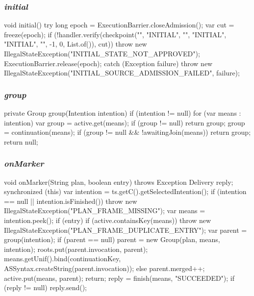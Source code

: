\documentclass[12pt,a4paper,oneside]{extreport}
\begin{document}
\subsubsection*{\textit{initial}}
\begin{thesiscode}[firstnumber=29]
void initial() {
    try {
        long epoch = ExecutionBarrier.closeAdmission();
        var cut = freeze(epoch);
        if (!handler.verify(checkpoint("", "INITIAL", "", "INITIAL", "INITIAL", "", -1, 0, List.of()), cut))
            throw new IllegalStateException("INITIAL_STATE_NOT_APPROVED");
        ExecutionBarrier.release(epoch);
    } catch (Exception failure) { throw new IllegalStateException("INITIAL_SOURCE_ADMISSION_FAILED", failure); }
}
\end{thesiscode}

\subsubsection*{\textit{group}}
\begin{thesiscode}[firstnumber=183]
private Group group(Intention intention) {
    if (intention != null) for (var means : intention) {
        var group = active.get(means); if (group != null) return group;
        group = continuation(means);
        if (group != null && !awaitingJoin(means)) return group;
    }
    return null;
}
\end{thesiscode}

\subsubsection*{\textit{onMarker}}
\begin{thesiscode}[firstnumber=200]
void onMarker(String plan, boolean entry) throws Exception {
    Delivery reply;
    synchronized (this) {
        var intention = ts.getC().getSelectedIntention();
        if (intention == null || intention.isFinished()) throw new IllegalStateException("PLAN_FRAME_MISSING");
        var means = intention.peek();
        if (entry) {
            if (active.containsKey(means)) throw new IllegalStateException("PLAN_FRAME_DUPLICATE_ENTRY");
            var parent = group(intention);
            if (parent == null) {
                parent = new Group(plan, means, intention);
                roots.put(parent.invocation, parent);
                means.getUnif().bind(continuationKey, ASSyntax.createString(parent.invocation));
            } else {
                parent.merged++;
            }
            active.put(means, parent);
            return;
        }
        reply = finish(means, "SUCCEEDED");
    }
    if (reply != null) reply.send();
}
\end{thesiscode}
\end{document}
